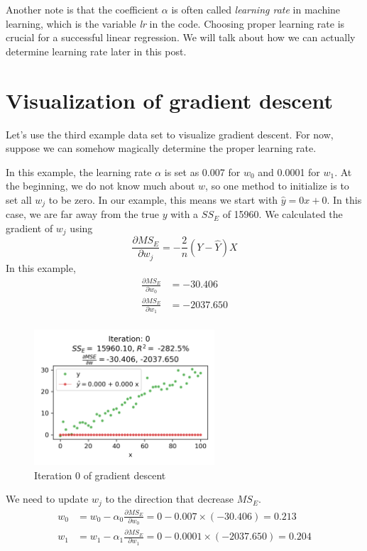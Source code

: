 \documentclass[
	letterpaper
]{article}
\begin{document}
Another note is that the coefficient $\alpha$ is often called \textit{learning rate} in machine learning, which is the variable \textit{lr} in the code. 
Choosing proper learning rate is crucial for a successful linear regression.
We will talk about how we can actually determine learning rate later in this post.

\section{Visualization of gradient descent}
Let's use the third example data set to visualize gradient descent.
For now, suppose we can somehow magically determine the proper learning rate.

In this example, the learning rate $\alpha$ is set as 0.007 for $w_0$ and 0.0001 for $w_1$.
At the beginning, we do not know much about $w$, so one method to initialize is to set all $w_j$ to be zero.
In our example, this means we start with $\hat y = 0 x + 0$.
In this case, we are far away from the true $y$ with a $SS_E$ of 15960.
We calculated the gradient of $w_j$ using
\begin{equation}
\frac{\partial MS_E}{\partial w_j} = -\frac{2}{n} (Y - \hat Y)X
\end{equation}
In this example,
\begin{equation}
\begin{split}
\frac{\partial MS_E}{\partial w_0} &= -30.406\\
\frac{\partial MS_E}{\partial w_1} &= -2037.650\\
\end{split}
\end{equation}
\begin{figure}[htbp]
	\centering
	\includegraphics[width=0.6\textwidth]{figures/visualize-0.png}
	\caption{Iteration 0 of gradient descent}
	\label{fig:vis0}
\end{figure}

We need to update $w_j$ to the direction that decrease $MS_E$.
\begin{equation}
\begin{split}
w_0 &= w_0 - \alpha_0 \frac{\partial MS_E}{\partial w_0} = 0 - 0.007\times (-30.406) = 0.213\\
w_1 &= w_1 - \alpha_ 1 \frac{\partial MS_E}{\partial w_1} = 0 - 0.0001\times (-2037.650)=0.204 \\
\end{split}
\end{equation}
\end{document}
